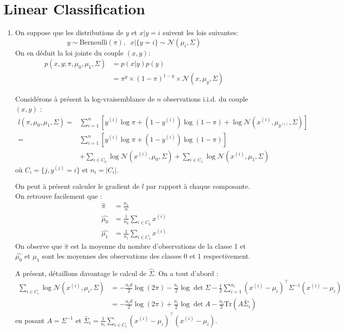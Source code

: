 \documentclass{article}
\begin{document}
\section{Linear Classification}


\begin{enumerate}[label=(\alph*)]
\item On suppose que les distributions de $y$ et $x|y=i$ suivent les lois suivantes:
$$
y\sim \text{Bernoulli}(\pi),\;\; x|\{y=i\} \sim \mathcal{N}(\mu_i, \Sigma)
$$
On en déduit la loi jointe du couple $(x,y)$:
\begin{align*}
p(x, y; \pi, \mu_0, \mu_1, \Sigma) &= p(x|y)p(y)\\
&= \pi^y \times (1-\pi)^{1-y} \times \mathcal{N}(x, \mu_y, \Sigma)
\end{align*}

Considérons à présent la log-vraisemblance de $n$ observations i.i.d. du couple $(x,y)$ :
\begin{align*}
l(\pi, \mu_0, \mu_1, \Sigma) =& \sum_{i=1}^n \left[ y^{(i)} \log \pi + (1-y^{(i)})\log(1-\pi) + \log \mathcal{N}(x^{(i)}, \mu_{y^{(i)}}, \Sigma) \right]\\
=& \sum_{i=1}^n \left[ y^{(i)} \log \pi + (1-y^{(i)})\log(1-\pi)\right]\\
 &+ \sum_{i\in C_0} \log \mathcal{N}(x^{(i)}, \mu_0, \Sigma) + \sum_{i\in C_1} \log \mathcal{N}(x^{(i)}, \mu_1, \Sigma)
\end{align*}
où $C_i = \{j, y^{(j)} = i\}$ et $n_i = |C_i|$.

On peut à présent calculer le gradient de $l$ par rapport à chaque composante. On retrouve facilement que :
\begin{align*}
\hat{\pi} &= \frac{n_1}{n}\\
\hat{\mu_0} &= \frac{1}{n_0} \sum_{i\in C_0} x^{(i)}\\
\hat{\mu_1} &= \frac{1}{n_1} \sum_{i\in C_1} x^{(i)}
\end{align*}
On observe que $\hat{\pi}$ est la moyenne du nombre d'observations de la classe 1 et $\hat{\mu_0}$ et $\hat{\mu_1}$ sont les moyennes des observations des classes 0 et 1 respectivement.

A présent, détaillons davantage le calcul de $\hat{\Sigma}$. On a tout d'abord :
\begin{align*}
\sum_{i\in C_i} \log \mathcal{N}(x^{(i)}, \mu_i, \Sigma) &= -\frac{n_i d}{2} \log(2\pi) - \frac{n_i}{2}\log \det \Sigma - \frac{1}{2}\sum_{i=1}^{n_i}(x^{(i)}-\mu_i)^\intercal \Sigma^{-1} (x^{(i)}-\mu_i)\\
&= -\frac{n_i d}{2} \log(2\pi) + \frac{n_i}{2}\log \det A - \frac{n_i}{2} \text{Tr}(A\tilde{\Sigma_i})
\end{align*}
en posant $A = \Sigma^{-1}$ et $\tilde{\Sigma_i} = \frac{1}{n_i}\sum_{i\in C_i}(x^{(i)}-\mu_i)^\intercal (x^{(i)}-\mu_i)$.


\end{enumerate}
\end{document}
